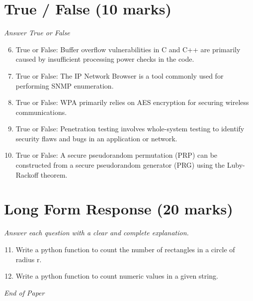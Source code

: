 \documentclass[12pt]{article}
\begin{document}
\section*{True / False (10 marks)}
\textit{Answer True or False}
\begin{enumerate}[label=\arabic*.]
\setcounter{enumi}{5}
\item True or False: Buffer overflow vulnerabilities in C and C++ are primarily caused by insufficient processing power checks in the code.
\item True or False: The IP Network Browser is a tool commonly used for performing SNMP enumeration.
\item True or False: WPA primarily relies on AES encryption for securing wireless communications.
\item True or False: Penetration testing involves whole-system testing to identify security flaws and bugs in an application or network.
\item True or False: A secure pseudorandom permutation (PRP) can be constructed from a secure pseudorandom generator (PRG) using the Luby-Rackoff theorem.
\end{enumerate}

\section*{Long Form Response (20 marks)}
\textit{Answer each question with a clear and complete explanation.}
\begin{enumerate}[label=\arabic*.]
\setcounter{enumi}{10}
\item Write a python function to count the number of rectangles in a circle of radius r.
\item Write a python function to count numeric values in a given string.
\end{enumerate}

\vfill
\noindent\textit{End of Paper}
\end{document}
